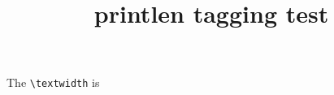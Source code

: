 \documentclass{article}
\title{printlen tagging test}
\begin{document}
The \verb|\textwidth| is \printlength{\textwidth}

\printlength{\textwidth}

\printlength{\textwidth}

\rndprintlength{\textwidth}
\end{document}
